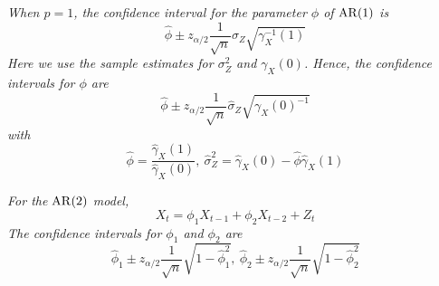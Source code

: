 \begin{example}
    \emph{
        When $p=1$, the confidence interval for the parameter $\phi$ of $\operatorname{AR}(1)$ is 
        \[\hat{\phi} \pm z_{\alpha/2}\frac{1}{\sqrt{n}}\sigma_Z\sqrt{\gamma_X^{-1}(1)}\]
        Here we use the sample estimates for $\sigma_Z^2$ and $\gamma_X(0)$. Hence, the confidence intervals for $\phi$ are
        \[\hat{\phi} \pm z_{\alpha/2} \frac{1}{\sqrt{n}} \hat{\sigma}_Z\sqrt{\gamma_X(0)^{-1}}\]
        with 
        \[\hat{\phi} = \frac{\hat\gamma_X(1)}{\hat\gamma_X(0)}, \ \hat{\sigma}_Z^2 = \hat{\gamma}_X(0) - \hat{\phi}\hat{\gamma}_X(1)\]
        }
\end{example}

\begin{example}
    \emph{
        For the $\operatorname{AR}(2)$ model,
        \[X_t = \phi_1 X_{t-1} + \phi_2 X_{t-2} + Z_t\]
        The confidence intervals for $\phi_1$ and $\phi_2$ are
        \[\hat{\phi}_1 \pm z_{\alpha/2}\frac{1}{\sqrt{n}}\sqrt{1-\hat{\phi}_1^2}, \ \hat{\phi}_2 \pm z_{\alpha/2}\frac{1}{\sqrt{n}}\sqrt{1-\hat{\phi}_2^2}\]
    }
\end{example}